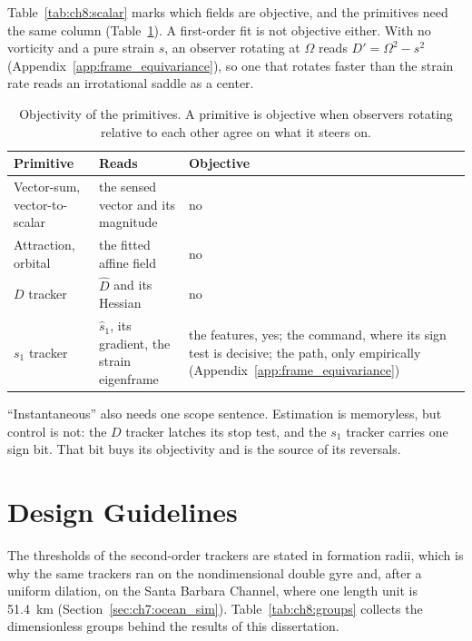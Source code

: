 Table~\ref{tab:ch8:scalar} marks which fields are objective, and the
primitives need the same column (Table~\ref{tab:ch8:objectivity}). A
first-order fit is not objective either. With no vorticity and a pure
strain $s$, an observer rotating at $\Omega$ reads $D' = \Omega^2 - s^2$
(Appendix~\ref{app:frame_equivariance}), so one that rotates faster than
the strain rate reads an irrotational saddle as a center.

\begin{table}[htbp]
\centering
\caption{Objectivity of the primitives. A primitive is objective when
observers rotating relative to each other agree on what it steers on.}
\label{tab:ch8:objectivity}
\small
\begin{tabular}{>{\raggedright\arraybackslash}p{3.4cm} >{\raggedright\arraybackslash}p{3.8cm} >{\raggedright\arraybackslash}p{5.2cm}}
\hline
Primitive & Reads & Objective \\
\hline
Vector-sum, vector-to-scalar & the sensed vector and its magnitude & no \\
Attraction, orbital & the fitted affine field & no \\
$D$ tracker & $\hat{D}$ and its Hessian & no \\
$s_1$ tracker & $\hat{s}_1$, its gradient, the strain eigenframe & the features, yes; the command, where its sign test is decisive; the path, only empirically (Appendix~\ref{app:frame_equivariance}) \\
\hline
\end{tabular}
\end{table}

``Instantaneous'' also needs one scope sentence. Estimation is memoryless,
but control is not: the $D$ tracker latches its stop test, and the $s_1$
tracker carries one sign bit. That bit buys its objectivity and is the
source of its reversals.

\section{Design Guidelines}
\label{sec:ch8:guidelines}

The thresholds of the second-order trackers are stated in formation radii,
which is why the same trackers ran on the nondimensional double gyre and,
after a uniform dilation, on the Santa Barbara Channel, where one length
unit is 51.4~km (Section~\ref{sec:ch7:ocean_sim}).
Table~\ref{tab:ch8:groups} collects the dimensionless groups behind the
results of this dissertation.

